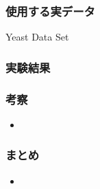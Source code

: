 \documentclass[13pt,dvipdfmx]{beamer}
\begin{document}
\begin{frame}\frametitle{使用する実データ}
\begin{center}
{\Large Yeast Data Set}
\begin{figure}
\end{figure}
\end{center}
\end{frame}

\begin{frame}\frametitle{実験結果}
\begin{center}
{\Large}
\begin{figure}
\end{figure}
\end{center}
\end{frame}

\begin{frame}\frametitle{考察}
\begin{itemize}
 \item 
\end{itemize}
\end{frame}

\begin{frame}\frametitle{まとめ}
\begin{itemize}
 \item 
\end{itemize}
\end{frame}
\end{document}
